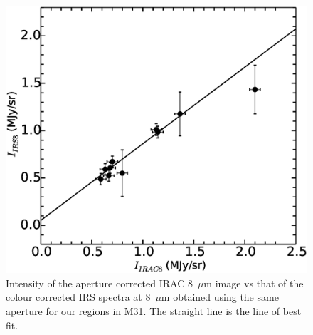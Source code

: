 	
\begin{figure}
\centering
\includegraphics[scale=0.25]{./offset.eps}
\caption{ Intensity of the aperture corrected IRAC 8~$\mu$m image vs that of the colour corrected IRS spectra at 8~$\mu$m  obtained using the same aperture for our regions in M31. The straight line is the line of best fit. }
\label{offset}
\end{figure}



